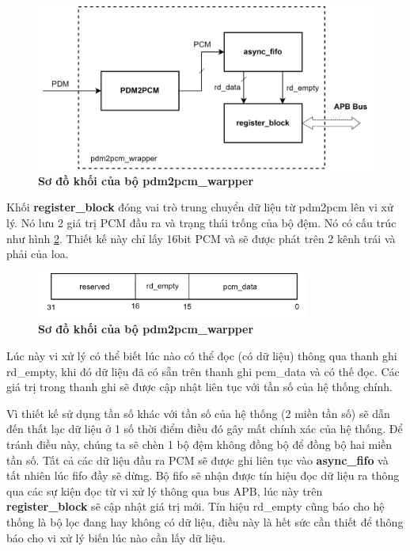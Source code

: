 \begin{figure}[H]
    \centering
    \includegraphics[width=13cm]{Images/Chuong5/fpga/wrapper.png}
    \caption[Sơ đồ khối của bộ pdm2pcm\_warpper]{\bfseries \fontsize{12pt}{0pt}\selectfont Sơ đồ khối của bộ pdm2pcm\_warpper}
    \label{wrapper}
\end{figure}

Khối \textbf{register\_block} đóng vai trò trung chuyển dữ liệu từ pdm2pcm lên vi xử lý. Nó lưu 2 giá trị PCM đầu ra và trạng thái trống của bộ đệm. Nó có cấu trúc như hình \ref{bit}. Thiết kế này chỉ lấy 16bit PCM và sẽ được phát trên 2 kênh trái và phải của loa.

\begin{figure}[H]
    \centering
    \includegraphics[width=9cm]{Images/Chuong5/fpga/bit.png}
    \caption[Sơ đồ khối của bộ pdm2pcm\_warpper]{\bfseries \fontsize{12pt}{0pt}\selectfont Sơ đồ khối của bộ pdm2pcm\_warpper}
    \label{bit}
\end{figure}

Lúc này vi xử lý có thể biết lúc nào có thể đọc (có dữ liệu) thông qua thanh ghi rd\_empty, khi đó dữ liệu đã có sẵn trên thanh ghi pcm\_data và có thế đọc. Các giá trị trong thanh ghi sẽ được cập nhật liên tục với tần số của hệ thống chính.

Vì thiết kế sử dụng tần số khác với tần số của hệ thống (2 miền tần số) sẽ dẫn đến thất lạc dữ liệu ở 1 số thời điểm điều đó gây mất chính xác của hệ thống. Để tránh điều này, chúng ta sẽ chèn 1 bộ đệm không đồng bộ để đồng bộ hai miền tần số. Tất cả các dữ liệu đầu ra PCM sẽ được ghi liên tục vào \textbf{async\_fifo} và tất nhiên lúc fifo đầy sẽ dừng. Bộ fifo sẽ nhận được tín hiệu đọc dữ liệu ra thông qua các sự kiện đọc từ vi xử lý thông qua bus APB, lúc này trên \textbf{register\_block} sẽ cập nhật giá trị mới. Tín hiệu rd\_empty cũng báo cho hệ thống là bộ lọc đang hay không có dữ liệu, điều này là hết sức cần thiết để thông báo cho vi xử lý biến lúc nào cần lấy dữ liệu.

